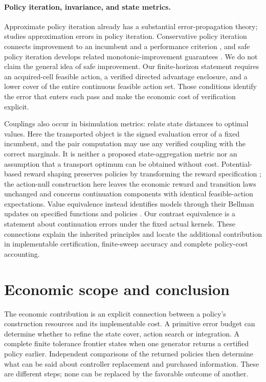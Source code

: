 \documentclass[ecta,nameyear,draft]{econsocart}
\begin{document}
\paragraph{Policy iteration, invariance, and state metrics.}
Approximate policy iteration already has a substantial error-propagation theory; \citet{munos2003} studies approximation errors in policy iteration. Conservative policy iteration connects improvement to an incumbent and a performance criterion \citep{kakade2002}, and safe policy iteration develops related monotonic-improvement guarantees \citep{pirotta2013}. We do not claim the general idea of safe improvement. Our finite-horizon statement requires an acquired-cell feasible action, a verified directed advantage enclosure, and a lower cover of the entire continuous feasible action set. Those conditions identify the error that enters each pass and make the economic cost of verification explicit.

Couplings also occur in bisimulation metrics: \citet{ferns2004} relate state distances to optimal values. Here the transported object is the signed evaluation error of a fixed incumbent, and the pair computation may use any verified coupling with the correct marginals. It is neither a proposed state-aggregation metric nor an assumption that a transport optimum can be obtained without cost. Potential-based reward shaping preserves policies by transforming the reward specification \citep{ng1999}; the action-null construction here leaves the economic reward and transition laws unchanged and concerns continuation components with identical feasible-action expectations. Value equivalence instead identifies models through their Bellman updates on specified functions and policies \citep{grimm2020}. Our contrast equivalence is a statement about continuation errors under the fixed actual kernels. These connections explain the inherited principles and locate the additional contribution in implementable certification, finite-sweep accuracy and complete policy-cost accounting.














\section{Economic scope and conclusion}\label{sec:conclusion49}
The economic contribution is an explicit connection between a policy's construction resources and its implementable cost. A primitive error budget can determine whether to refine the state cover, action search or integration. A complete finite tolerance frontier states when one generator returns a certified policy earlier. Independent comparisons of the returned policies then determine what can be said about controller replacement and purchased information. These are different steps; none can be replaced by the favorable outcome of another.
\end{document}
